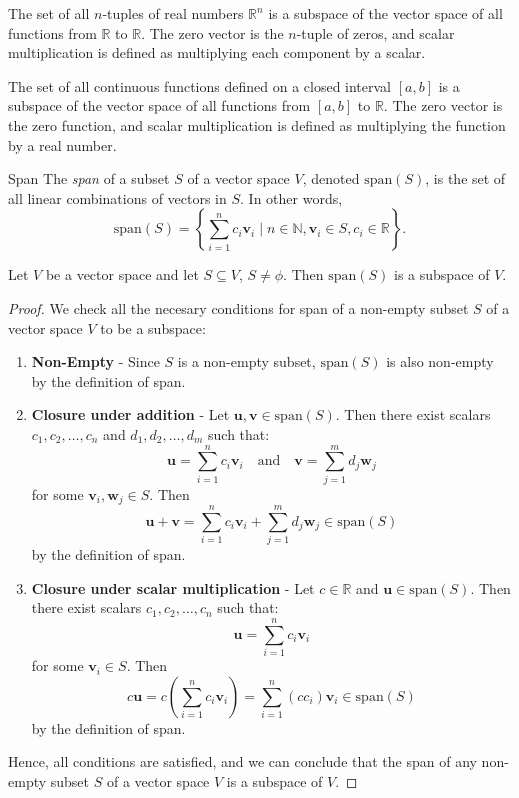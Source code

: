 \documentclass[openany]{book}
\begin{document}
\begin{example}
    The set of all $n$-tuples of real numbers $\mathbb{R}^n$ is a subspace of the vector space of all functions from $\mathbb{R}$ to $\mathbb{R}$. The zero vector is the $n$-tuple of zeros, and scalar multiplication is defined as multiplying each component by a scalar.
\end{example}
\begin{example}
    The set of all continuous functions defined on a closed interval $[a, b]$ is a subspace of the vector space of all functions from $[a, b]$ to $\mathbb{R}$. The zero vector is the zero function, and scalar multiplication is defined as multiplying the function by a real number.
\end{example}
\begin{mydefinition}{Span}
    The \emph{span} of a subset $S$ of a vector space $V$, denoted $\text{span}(S)$, is the set of all linear combinations of vectors in $S$. In other words,
    $$\text{span}(S) = \left\{ \sum_{i=1}^n c_i \mathbf{v}_i \mid n \in \mathbb{N}, \mathbf{v}_i \in S, c_i \in \mathbb{R} \right\}.$$
\end{mydefinition}
\begin{mytheorem}
    Let $V$ be a vector space and let $S \subseteq V$, $S \neq \phi$. Then $\text{span}(S)$ is a subspace of $V$.
\end{mytheorem}
\begin{proof}
    We check all the necesary conditions for span of a non-empty subset $S$ of a vector space $V$ to be a subspace:
    \begin{enumerate}
    \item \textbf{Non-Empty} - Since $S$ is a non-empty subset, $\text{span}(S)$ is also non-empty by the definition of span.
    \item \textbf{Closure under addition} - Let $\mathbf{u}, \mathbf{v} \in \text{span}(S)$. Then there exist scalars $c_1, c_2, \ldots, c_n$ and $d_1, d_2, \ldots, d_m$ such that:
    $$\mathbf{u} = \sum_{i=1}^n c_i \mathbf{v}_i \quad \text{and} \quad \mathbf{v} = \sum_{j=1}^m d_j \mathbf{w}_j$$
    for some $\mathbf{v}_i, \mathbf{w}_j \in S$. Then
    $$\mathbf{u} + \mathbf{v} = \sum_{i=1}^n c_i \mathbf{v}_i + \sum_{j=1}^m d_j \mathbf{w}_j \in \text{span}(S)$$
    by the definition of span.
    \item \textbf{Closure under scalar multiplication} - Let $c \in \mathbb{R}$ and $\mathbf{u} \in \text{span}(S)$. Then there exist scalars $c_1, c_2, \ldots, c_n$ such that:
    $$\mathbf{u} = \sum_{i=1}^n c_i \mathbf{v}_i$$
    for some $\mathbf{v}_i \in S$. Then
    $$c\mathbf{u} = c\left(\sum_{i=1}^n c_i \mathbf{v}_i\right) = \sum_{i=1}^n (cc_i) \mathbf{v}_i \in \text{span}(S)$$
    by the definition of span.
    \end{enumerate}
    Hence, all conditions are satisfied, and we can conclude that the span of any non-empty subset $S$ of a vector space $V$ is a subspace of $V$.
\end{proof}
\end{document}
